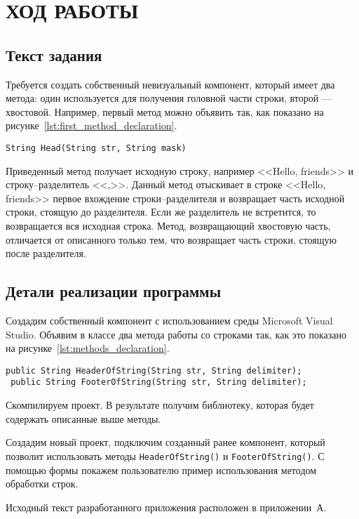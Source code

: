 \section{ХОД РАБОТЫ}

\subsection{Текст задания}

Требуется создать собственный невизуальный компонент, который
имеет два метода: один используется для получения головной части строки,
второй --- хвостовой. Например, первый метод можно объявить так, как показано
на рисунке~\ref{lst:first_method_declaration}.
\begin{lstlisting}[caption= Пример объявления первого метода,
                   label=lst:first_method_declaration]
 String Head(String str, String mask)
\end{lstlisting}

Приведенный метод получает исходную строку, например <<Hello, friends>> и
строку--разделитель <<,>>. Данный метод отыскивает в строке <<Hello, friends>>
первое вхождение строки--разделителя и возвращает часть исходной строки,
стоящую до разделителя. Если же разделитель не встретится, то возвращается
вся исходная строка. Метод, возвращающий хвостовую часть, отличается от описанного
только тем, что возвращает часть строки, стоящую после разделителя.

\subsection{Детали реализации программы}

Создадим собственный компонент с использованием среды Microsoft Visual Studio.
Объявим в классе два метода работы со строками так, как это показано
на рисунке~\ref{lst:methods_declaration}.
\begin{lstlisting}[caption= Объявление методов для работы со строками,
                   label=lst:methods_declaration]
 public String HeaderOfString(String str, String delimiter);
 public String FooterOfString(String str, String delimiter);
\end{lstlisting}

Скомпилируем проект. В результате получим библиотеку, которая будет содержать
описанные выше методы.

Создадим новый проект, подключим созданный ранее компонент, который позволит
использовать методы \texttt{HeaderOfString()} и \texttt{FooterOfString()}.
С помощью формы покажем пользователю пример использования методом обработки строк.


Исходный текст разработанного приложения расположен в приложении~А.

\newpage
